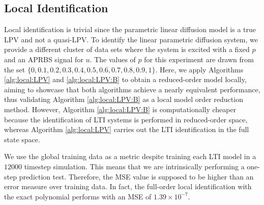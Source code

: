 \subsection{Local Identification}


Local identification is trivial since the parametric linear diffusion model is a true LPV and not a quasi-LPV.
%
%
To identify the linear parametric diffusion system, we provide a different cluster of data sets where the system is excited with a fixed $p$ and an APRBS signal for $u$. 
%
The values of $p$ for this experiment are drawn from the set $\{0,0.1,0.2,0.3,0.4,0.5,0.6,0.7,0.8,0.9,1\}$.
%
Here, we apply Algorithms \ref{alg:local:LPV} and \ref{alg:local:LPV:B}  to obtain a reduced-order model locally, aiming to showcase that both algorithms achieve a nearly equivalent performance, thus validating Algorithm \ref{alg:local:LPV:B} as a local model order reduction method.
   However, Algorithm \ref{alg:local:LPV:B} is computationally cheaper because the identification of LTI systems is performed in reduced-order space, whereas Algorithm \ref{alg:local:LPV} carries out the LTI identification in the full state space.  


    We use the global training data as a metric despite training each LTI model in a $12000$ timestep simulation.
%
This means that we are intrinsically performing a one-step prediction test. Therefore, the MSE value is supposed to be higher than an error measure over training data.
%
In fact, the full-order local identification with the exact polynomial performs with an MSE of $1.39 \times 10^{-7}$.


